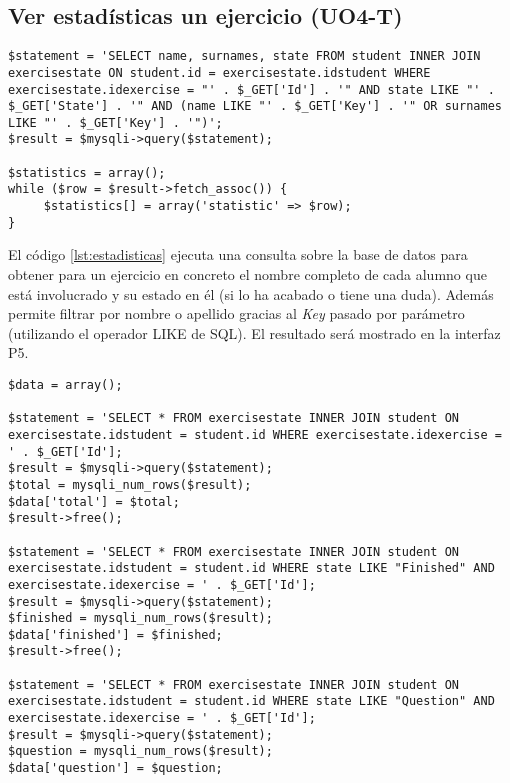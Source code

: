 \subsection{Ver estadísticas un ejercicio (UO4-T)}
\label{diseno-e-implementacion:logica-negocio:estadisticas} 

\noindent
\begin{lstlisting}[caption=Obtener estadísticas de un ejercicio.,label={lst:estadisticas}]
$statement = 'SELECT name, surnames, state FROM student INNER JOIN exercisestate ON student.id = exercisestate.idstudent WHERE exercisestate.idexercise = "' . $_GET['Id'] . '" AND state LIKE "' . $_GET['State'] . '" AND (name LIKE "' . $_GET['Key'] . '" OR surnames LIKE "' . $_GET['Key'] . '")';
$result = $mysqli->query($statement);

$statistics = array();
while ($row = $result->fetch_assoc()) {
     $statistics[] = array('statistic' => $row);
}
\end{lstlisting}

El código \ref{lst:estadisticas} ejecuta una consulta sobre la base de datos para obtener para un ejercicio en concreto el nombre completo de cada alumno que está involucrado y su estado en él (si lo ha acabado o tiene una duda). Además permite filtrar por nombre o apellido gracias al \textit{Key} pasado por parámetro (utilizando el operador LIKE de SQL). El resultado será mostrado en la interfaz P5.\\

\noindent
\begin{lstlisting}[caption=Obtener porcentajes para las estadísticas e un ejercicio.,label={lst:estadisticas-2}]
$data = array();

$statement = 'SELECT * FROM exercisestate INNER JOIN student ON exercisestate.idstudent = student.id WHERE exercisestate.idexercise = ' . $_GET['Id'];
$result = $mysqli->query($statement);
$total = mysqli_num_rows($result);
$data['total'] = $total;
$result->free();
	
$statement = 'SELECT * FROM exercisestate INNER JOIN student ON exercisestate.idstudent = student.id WHERE state LIKE "Finished" AND exercisestate.idexercise = ' . $_GET['Id'];
$result = $mysqli->query($statement);
$finished = mysqli_num_rows($result);
$data['finished'] = $finished;
$result->free();
	
$statement = 'SELECT * FROM exercisestate INNER JOIN student ON exercisestate.idstudent = student.id WHERE state LIKE "Question" AND exercisestate.idexercise = ' . $_GET['Id'];
$result = $mysqli->query($statement);
$question = mysqli_num_rows($result);
$data['question'] = $question;
\end{lstlisting}


